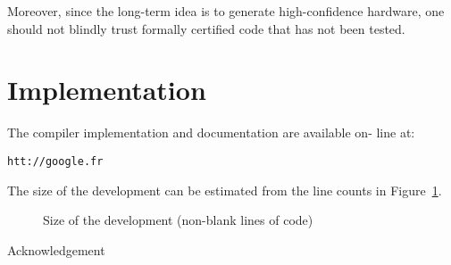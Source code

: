 \documentclass[preprint]{sigplanconf}
\begin{document}
Moreover, since the long-term idea is to generate high-confidence
hardware, one should not blindly trust formally certified code that
has not been tested.

\section{Implementation}
The compiler implementation and documentation are available on- line
at: 
%
\begin{center}
  \texttt{htt://google.fr}
\end{center}
%
The size of the development can be estimated from the line counts in
Figure~\ref{fig:loc}.
\begin{figure}
  \centering  
  \caption{Size of the development (non-blank lines of code)}
  \label{fig:loc}
\end{figure}






\acks Acknowledgement



\end{document}
